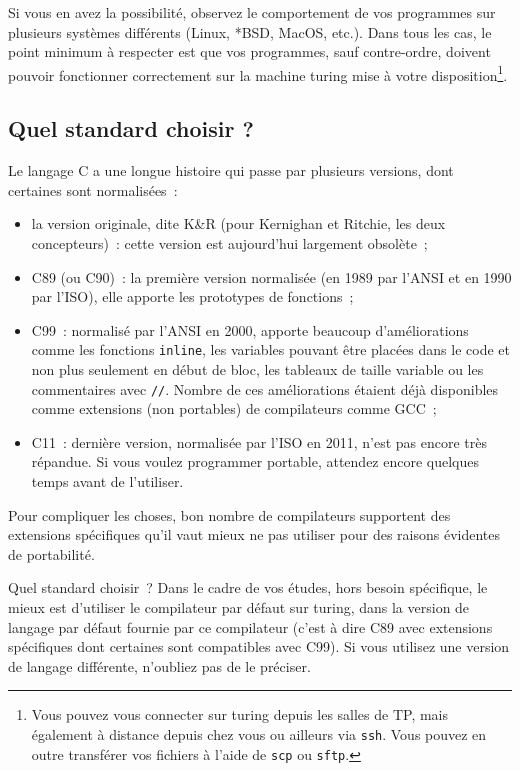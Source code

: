 \documentclass {article}
\begin{document}
Si vous en avez la possibilité, observez le comportement de vos
programmes sur plusieurs systèmes différents (Linux, *BSD, MacOS, etc.).
Dans tous les cas, le point minimum à respecter est que vos programmes,
sauf contre-ordre, doivent pouvoir fonctionner correctement sur la machine
turing mise à votre disposition\footnote {Vous pouvez vous connecter
sur turing depuis les salles de TP, mais également à distance depuis
chez vous ou ailleurs via \texttt {ssh}. Vous pouvez en outre transférer
vos fichiers à l'aide de \texttt {scp} ou \texttt {sftp}.}.


\subsection {Quel standard choisir ?}

Le langage C a une longue histoire qui passe par plusieurs versions,
dont certaines sont normalisées~:

\begin {itemize}
    \item la version originale, dite K\&R (pour Kernighan et Ritchie,
	les deux concepteurs)~: cette version est aujourd'hui largement
	obsolète~;

    \item C89 (ou C90)~: la première version normalisée (en 1989 par
	l'ANSI et en 1990 par l'ISO), elle apporte les prototypes de
	fonctions~;

    \item C99~: normalisé par l'ANSI en 2000, apporte beaucoup
	d'améliorations comme les fonctions \texttt {inline}, les
	variables pouvant être placées dans le code et non plus
	seulement en début de bloc, les tableaux de taille variable ou
	les commentaires avec \verb|//|. Nombre de ces améliorations
	étaient déjà disponibles comme extensions (non portables)
	de compilateurs comme GCC~;

    \item C11~: dernière version, normalisée par l'ISO en 2011, n'est
	pas encore très répandue. Si vous voulez programmer portable,
	attendez encore quelques temps avant de l'utiliser.

\end {itemize}

Pour compliquer les choses, bon nombre de compilateurs supportent des
extensions spécifiques qu'il vaut mieux ne pas utiliser pour des raisons
évidentes de portabilité.

Quel standard choisir~? Dans le cadre de vos études, hors besoin
spécifique, le mieux est d'utiliser le compilateur par défaut
sur turing, dans la version de langage par défaut fournie par ce
compilateur (c'est à dire C89 avec extensions spécifiques dont
certaines sont compatibles avec C99). Si vous utilisez une version de
langage différente, n'oubliez pas de le préciser.
\end{document}
